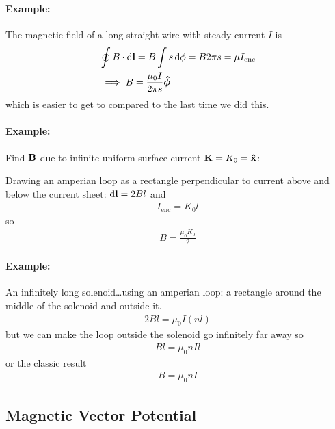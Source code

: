 \documentclass[../main.tex]{subfiles}
\begin{document}
\paragraph{Example:} The magnetic field of a long straight wire with steady current $I$ is
\begin{align*}
    &\oint B \cdot \dd{\vb l} = B \int s \dd{\phi} = B 2\pi s = \mu I_\text{enc} \\
    &\implies B = \frac{\mu_0 I}{2\pi s} \vu*{\phi}
\end{align*}
which is easier to get to compared to the last time we did this.

\paragraph{Example:} Find $\vb B$ due to infinite uniform surface current $\vb K = K_0 = \vu x$:

Drawing an amperian loop as a rectangle perpendicular to current above and below the current sheet: $\dd{\vb l} = 2 B l$ and
\begin{align*}
    I_\text{enc} = K_0 l
\end{align*}
so
\begin{align*}
    B = \frac{\mu_0 K_0}{2}
\end{align*}

\paragraph{Example:} An infinitely long solenoid\dots using an amperian loop: a rectangle around the middle of the solenoid and outside it.
\begin{align*}
    2Bl = \mu_0 I (n l)
\end{align*}
but we can make the loop outside the solenoid go infinitely far away so
\begin{align*}
    Bl = \mu_0 n I l
\end{align*}
or the classic result
\begin{align*}
    \boxed{
        B = \mu_0 n I
    }
\end{align*}

\newpage
{}

\subsection{Magnetic Vector Potential}
\end{document}
